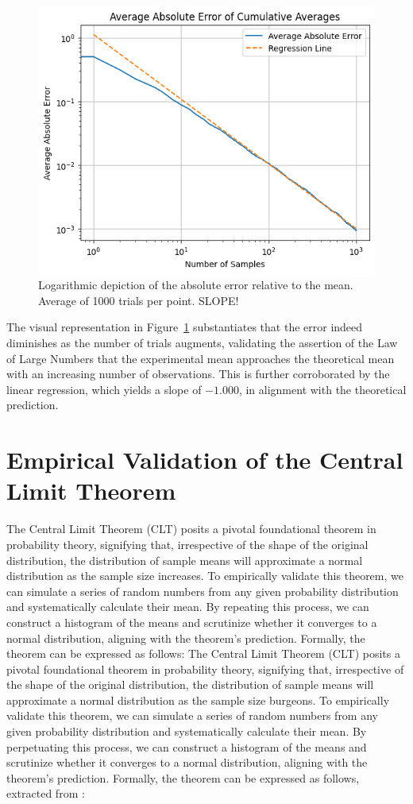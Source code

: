 \documentclass{report}
\begin{document}
\begin{figure}[H]
	\centering
	\includegraphics[width=0.5\linewidth]{./Figures/LLN/verifloglog.png}
	\caption{Logarithmic depiction of the absolute error relative to the mean. Average of 1000 trials per point. SLOPE!}
	\label{fig:verificationllnlog}
\end{figure}

The visual representation in Figure~\ref{fig:verificationllnlog} substantiates that the error indeed diminishes as the number of trials augments, validating the assertion of the Law of Large Numbers that the experimental mean approaches the theoretical mean with an increasing number of observations. This is further corroborated by the linear regression, which yields a slope of \(-1.000\), in alignment with the theoretical prediction.

\section{Empirical Validation of the Central Limit Theorem}
\label{sec:clt}

The Central Limit Theorem (CLT) posits a pivotal foundational theorem in probability theory, signifying that, irrespective of the shape of the original distribution, the distribution of sample means will approximate a normal distribution as the sample size increases. To empirically validate this theorem, we can simulate a series of random numbers from any given probability distribution and systematically calculate their mean. By repeating this process, we can construct a histogram of the means and scrutinize whether it converges to a normal distribution, aligning with the theorem's prediction. Formally, the theorem can be expressed as follows:
The Central Limit Theorem (CLT) posits a pivotal foundational theorem in probability theory, signifying that, irrespective of the shape of the original distribution, the distribution of sample means will approximate a normal distribution as the sample size burgeons. To empirically validate this theorem, we can simulate a series of random numbers from any given probability distribution and systematically calculate their mean. By perpetuating this process, we can construct a histogram of the means and scrutinize whether it converges to a normal distribution, aligning with the theorem's prediction. Formally, the theorem can be expressed as follows, extracted from \cite{jourdain2016probabilites}:
\end{document}
